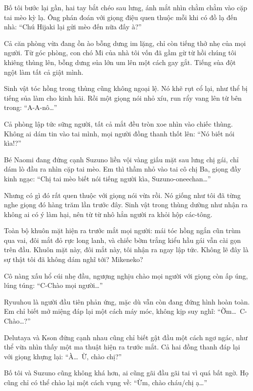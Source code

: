 ﻿\documentclass[../main.tex]{subfiles}
\begin{document}
Bố tôi bước lại gần, hai tay bắt chéo sau lưng, ánh mắt nhìn chằm chằm vào cặp tai mèo kỳ lạ. Ông phán đoán với giọng điệu quen thuộc mỗi khi có đồ lạ đến nhà: ``Chú Hijaki lại gửi mèo đến nữa đấy à?''

Cả căn phòng vừa đang ồn ào bỗng dưng im lặng, chỉ còn tiếng thở nhẹ của mọi người. Từ góc phòng, con chó Mi của nhà tôi vốn đã gầm gừ từ hồi chúng tôi khiêng thùng lên, bỗng dưng sủa lớn um lên một cách gay gắt. Tiếng sủa đột ngột làm tất cả giật mình.

Sinh vật tóc hồng trong thùng cũng không ngoại lệ. Nó khẽ rụt cổ lại, như thể bị tiếng sủa làm cho kinh hãi. Rồi một giọng nói nhỏ xíu, run rẩy vang lên từ bên trong: ``A-A-nô\dots''

Cả phòng lập tức sững người, tất cả mắt đều tròn xoe nhìn vào chiếc thùng. Không ai dám tin vào tai mình, mọi người đồng thanh thốt lên: ``Nó biết nói kìa!?''

Bé Naomi đang đứng cạnh Suzuno liền vội vàng giấu mặt sau lưng chị gái, chỉ dám lò đầu ra nhìn cặp tai mèo. Em thì thầm nhỏ vào tai cô chị Ba, giọng đầy kinh ngạc: ``Chị tai mèo biết nói tiếng người kìa, Suzuno-oneechan\dots''

Nhưng có gì đó rất quen thuộc với giọng nói vừa rồi. Nó giống như tôi đã từng nghe giọng đó hàng trăm lần trước đây. Sinh vật trong thùng dường như nhận ra không ai có ý làm hại, nên từ từ nhô hẳn người ra khỏi hộp các-tông.

Toàn bộ khuôn mặt hiện ra trước mắt mọi người: mái tóc hồng ngắn cũn trùm qua vai, đôi mắt đỏ rực long lanh, và chiếc bờm trắng kiểu hầu gái vẫn cài gọn trên đầu. Khuôn mặt này, đôi mắt này, tôi nhận ra ngay lập tức. Không lẽ đây là sự thật tôi đã không dám nghĩ tới? Mikeneko?

Cô nàng xấu hổ cúi nhẹ đầu, ngượng nghịu chào mọi người với giọng còn ấp úng, lúng túng: ``C-Chào mọi người\dots''

Ryuuhou là người đầu tiên phản ứng, mặc dù vẫn còn đang đứng hình hoàn toàn. Em chỉ biết mở miệng đáp lại một cách máy móc, không kịp suy nghĩ: ``Ờm\dots\ C-Chào\dots?''

Delutaya và Kson đứng cạnh nhau cũng chỉ biết gật đầu một cách ngơ ngác, như thể vừa nhìn thấy một ma thuật hiện ra trước mắt. Cả hai đồng thanh đáp lại với giọng khựng lại: ``À\dots\ Ừ, chào chị?''

Bố tôi và Suzuno cũng không khá hơn, ai cũng gãi đầu gãi tai vì quá bất ngờ. Họ cũng chỉ có thể chào lại một cách vụng về: ``Ừm, chào cháu/chị ạ\dots''
\end{document}
